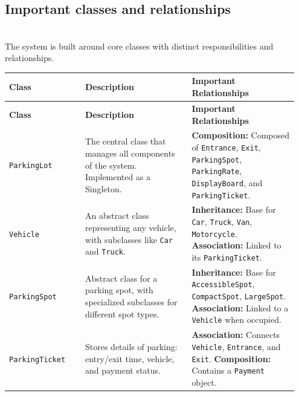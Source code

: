 \subsection{Important classes and relationships}\label{yRhw9-X2gM-ztEAPnqLzu}
\\
The system is built around core classes with distinct responsibilities and relationships.
\begin{center}
\renewcommand{\arraystretch}{1.4}

\begin{longtable}{|p{0.25\linewidth}|p{0.35\linewidth}|p{0.35\linewidth}|}
\hline
\textbf{Class} & \textbf{Description} & \textbf{Important Relationships} \\
\hline
\endfirsthead

\hline
\textbf{Class} & \textbf{Description} & \textbf{Important Relationships} \\
\hline
\endhead

\hline
\endfoot

\hline
\endlastfoot

\texttt{ParkingLot} &
The central class that manages all components of the system. Implemented as a Singleton. &
\textbf{Composition:} Composed of \texttt{Entrance}, \texttt{Exit}, \texttt{ParkingSpot}, \texttt{ParkingRate}, \texttt{DisplayBoard}, and \texttt{ParkingTicket}. \\
\hline

\texttt{Vehicle} &
An abstract class representing any vehicle, with subclasses like \texttt{Car} and \texttt{Truck}. &
\textbf{Inheritance:} Base for \texttt{Car}, \texttt{Truck}, \texttt{Van}, \texttt{Motorcycle}. \newline
\textbf{Association:} Linked to its \texttt{ParkingTicket}. \\
\hline

\texttt{ParkingSpot} &
Abstract class for a parking spot, with specialized subclasses for different spot types. &
\textbf{Inheritance:} Base for \texttt{AccessibleSpot}, \texttt{CompactSpot}, \texttt{LargeSpot}. \newline
\textbf{Association:} Linked to a \texttt{Vehicle} when occupied. \\
\hline

\texttt{ParkingTicket} &
Stores details of parking: entry/exit time, vehicle, and payment status. &
\textbf{Association:} Connects \texttt{Vehicle}, \texttt{Entrance}, and \texttt{Exit}. \newline
\textbf{Composition:} Contains a \texttt{Payment} object. \\
\hline


\end{longtable}
\end{center}
